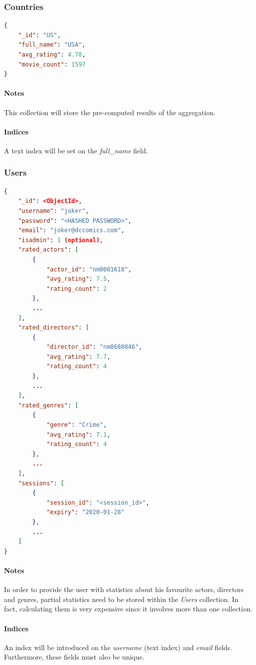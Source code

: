 \documentclass[11pt]{article}
\begin{document}
\subsubsection{Countries}
\label{sec:countries}

\begin{lstlisting}[language=json]	
{
	"_id": "US",
	"full_name": "USA",
	"avg_rating": 4.78,
	"movie_count": 1597
}
\end{lstlisting}

\paragraph{Notes}
This collection will store the pre-computed results of the aggregation.

\paragraph{Indices}
A text index will be set on the \emph{full\_name} field.

\subsubsection{Users}
\label{sec:users}

\begin{lstlisting}[language=json]	
{
	"_id": <ObjectId>,
	"username": "joker",
	"password": "<HASHED PASSWORD>",
	"email": "joker@dccomics.com",
	"isadmin": 1 (optional),
	"rated_actors": [
		{
			"actor_id": "nm0001618",
			"avg_rating": 7.5,
			"rating_count": 2
		},
		...
	],
	"rated_directors": [
		{
			"director_id": "nm0680846",
			"avg_rating": 7.7,
			"rating_count": 4
		},
		...
	],
	"rated_genres": [
		{
			"genre": "Crime",
			"avg_rating": 7.1,
			"rating_count": 4
		},
		...
	],
	"sessions": [
		{
			"session_id": "<session_id>",
			"expiry": "2020-01-28"
		},
		...
	]
}
\end{lstlisting}

\paragraph{Notes}
In order to provide the user with statistics about his favourite actors, directors
and genres, partial statistics need to be stored within the \emph{Users} collection. 
In fact, calculating them is very expensive since it involves 
more than one collection.

\paragraph{Indices} 
An index will be introduced on the \emph{username} (text index) and \emph{email} fields. 
Furthermore, these fields must also be unique.
\end{document}
